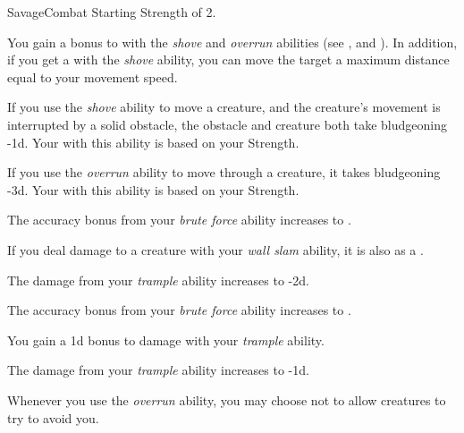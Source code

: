     \begin{feat}{Savage}{Combat}
        \featpre Starting Strength of 2.

         You gain a  bonus to  with the \textit{shove} and \textit{overrun} abilities (see , and ).
        In addition, if you get a  with the \textit{shove} ability, you can move the target a maximum distance equal to your movement speed.

         If you use the \textit{shove} ability to move a creature, and the creature's movement is interrupted by a solid obstacle, the obstacle and creature both take bludgeoning  -1d.
        Your  with this ability is based on your Strength.

         If you use the \textit{overrun} ability to move through a creature, it takes bludgeoning  -3d.
        Your  with this ability is based on your Strength.

         The accuracy bonus from your \textit{brute force} ability increases to .

         If you deal damage to a creature with your \textit{wall slam} ability, it is also  as a .

         The damage from your \textit{trample} ability increases to  -2d.

         The accuracy bonus from your \textit{brute force} ability increases to .

         You gain a \plus1d bonus to damage with your \textit{trample} ability.

         The damage from your \textit{trample} ability increases to  -1d.

         Whenever you use the \textit{overrun} ability, you may choose not to allow creatures to try to avoid you.
    \end{feat}

